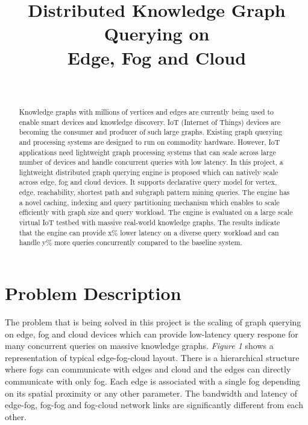 \documentclass[conference]{IEEEtran}
\begin{document}
\title{Distributed Knowledge Graph Querying on \\ Edge, Fog and Cloud}


\author{\\
}


\maketitle


\begin{abstract}
Knowledge graphs with millions of vertices and edges are currently being used to enable smart devices and knowledge discovery. IoT (Internet of Things) devices are becoming the consumer and producer of such large graphs. Existing graph querying and processing systems are designed to run on commodity hardware. However, IoT applications need lightweight graph processing systems that can scale across large number of devices and  handle concurrent queries with low latency. In this project, a lightweight distributed graph querying engine is proposed which can natively scale across edge, fog and cloud devices. It supports declarative query model for vertex, edge, reachability, shortest path and subgraph pattern mining queries. The engine has a novel caching, indexing and query partitioning mechanism which enables to scale efficiently with graph size and query workload. The engine is evaluated on a large scale virtual IoT testbed with massive real-world knowledge graphs. The results indicate that the engine can provide x\% lower latency on a diverse query workload and can handle y\% more queries concurrently compared to the baseline system.
\end{abstract}

\section{Problem Description}
The problem that is being solved in this project is the scaling of graph querying on edge, fog and cloud devices which can provide low-latency query respone for many concurrent queries on massive knowledge graphs. \emph{Figure 1} shows a representation of typical edge-fog-cloud layout. There is a hierarchical structure where fogs can communicate with edges and cloud and the edges can directly communicate with only fog. Each edge is associated with a single fog depending on its spatial proximity or any other parameter. The bandwidth and latency of edge-fog, fog-fog and fog-cloud network links are significantly different from each other.
\end{document}
